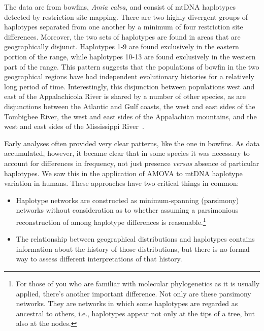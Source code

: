 \documentclass[12pt]{article}
\begin{document}
The data are from bowfins, {\it Amia calva}, and consist of mtDNA
haplotypes detected by restriction site mapping. There are two highly
divergent groups of haplotypes separated from one another by a minimum
of four restriction site differences. Moreover, the two sets of
haplotypes are found in areas that are geographically
disjunct. Haplotypes 1-9 are found exclusively in the eastern portion
of the range, while haplotypes 10-13 are found exclusively in the
western part of the range. This pattern suggests that the populations
of bowfin in the two geographical regions have had independent
evolutionary histories for a relatively long period of
time. Interestingly, this disjunction between populations west and
east of the Appalachicola River is shared by a number of other
species, as are disjunctions between the Atlantic and Gulf coasts, the
west and east sides of the Tombigbee River, the west and east sides of
the Appalachian mountains, and the west and east sides of the
Mississippi River~\cite{Soltis-etal-2006}.

Early analyses often provided very clear patterns, like the one in
bowfins. As data accumulated, however, it became clear that in some
species it was necessary to account for differences in frequency, not
just presence {\it versus\/} absence of particular haplotypes. We saw
this in the application of AMOVA to mtDNA haplotype variation in
humans. These approaches have two critical things in common:

\begin{itemize}

\item Haplotype networks are constructed as minimum-spanning
  (parsimony) networks without consideration as to whether assuming a
  parsimonious reconstruction of among haplotype differences is
  reasonable.\footnote{For those of you who are familiar with
    molecular phylogenetics as it is usually applied, there's another
    important difference. Not only are these parsimony networks. They
    are networks in which some haplotypes are regarded as ancestral to
    others, i.e., haplotypes appear not only at the tips of a tree,
    but also at the nodes.}

\item The relationship between geographical distributions and
  haplotypes contains information about the history of those
  distributions, but there is no formal way to assess different
  interpretations of that history.

\end{itemize}
\end{document}
